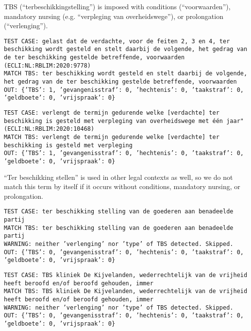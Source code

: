 \documentclass[a4paper]{article}
\begin{document}
TBS (``terbeschikkingstelling'') is imposed with conditions (``voorwaarden''), mandatory nursing (e.g. ``verpleging van overheidswege''), or prolongation (``verlenging'').

\texttt{TEST CASE: %
gelast dat de verdachte, voor de feiten 2, 3 en 4, ter beschikking wordt gesteld en stelt daarbij de volgende, het gedrag van de ter beschikking gestelde betreffende, voorwaarden (ECLI:NL:RBLIM:2020:9778)\\
MATCH TBS: ter beschikking wordt gesteld en stelt daarbij de volgende, het gedrag van de ter beschikking gestelde betreffende, voorwaarden\\
OUT: \{'TBS': 1, 'gevangenisstraf': 0, 'hechtenis': 0, 'taakstraf': 0, 'geldboete': 0, 'vrijspraak': 0\}}

\texttt{TEST CASE: %
verlengt de termijn gedurende welke [verdachte] ter beschikking is gesteld met verpleging van overheidswege met één jaar" (ECLI:NL:RBLIM:2020:10468)\\
MATCH TBS: verlengt de termijn gedurende welke [verdachte] ter beschikking is gesteld met verpleging\\
OUT: \{'TBS': 1, 'gevangenisstraf': 0, 'hechtenis': 0, 'taakstraf': 0, 'geldboete': 0, 'vrijspraak': 0\}}

``Ter beschikking stellen'' is used in other legal contexts as well, so we do not match this term by itself if it occurs without conditions, mandatory nursing, or prolongation.

\texttt{TEST CASE: %
ter beschikking stelling van de goederen aan benadeelde partij\\
MATCH TBS: ter beschikking stelling van de goederen aan benadeelde partij\\
WARNING: neither 'verlenging' nor 'type' of TBS detected. Skipped.\\
OUT: \{'TBS': 0, 'gevangenisstraf': 0, 'hechtenis': 0, 'taakstraf': 0, 'geldboete': 0, 'vrijspraak': 0\}}

\texttt{TEST CASE: %
TBS kliniek De Kijvelanden, wederrechtelijk van de vrijheid heeft beroofd en/of beroofd gehouden, immer\\
MATCH TBS: TBS kliniek De Kijvelanden, wederrechtelijk van de vrijheid heeft beroofd en/of beroofd gehouden, immer\\
WARNING: neither 'verlenging' nor 'type' of TBS detected. Skipped.\\
OUT: \{'TBS': 0, 'gevangenisstraf': 0, 'hechtenis': 0, 'taakstraf': 0, 'geldboete': 0, 'vrijspraak': 0\}}
\end{document}
